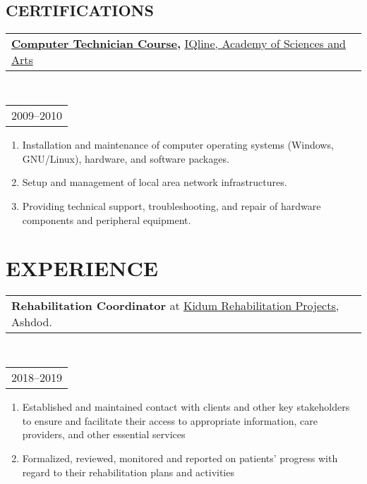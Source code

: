 \documentclass[11pt,a4paper,roman]{moderncv}      %
\makeatletter
\newcommand*{\customcventry}[7][.25em]{
	\begin{tabular}{@{}l} %
		{\bfseries #4} #3
	\end{tabular}
	\hfill%
	\begin{tabular}{l@{}}
	\end{tabular}
	\hfill
	\begin{tabular}{@{}l} %
		#7
	\end{tabular}
	\hfill%
	\begin{tabular}{l@{}} %
		 #2
	\end{tabular}
	\par\addvspace{#1}
}
\makeatother
\begin{document}
\subsection{CERTIFICATIONS}

{\customcventry{2009--2010}{\href{https://loona-il.000webhostapp.com/resume-references/computer-technitian-certificate.jpg}{IQline, Academy of Sciences and Arts}}{\href{https://loona-il.000webhostapp.com/resume-references/computer-technitian-certificate.jpg}{Computer Technician Course},}{Ashdod}{}{}	
	
	\begin{enumerate}[leftmargin=0.75cm,label=\textcolor{cyan}{\textbullet}]
		\itemsep 0em 
		\item Installation and maintenance of computer operating systems (Windows, GNU/Linux), hardware, and software packages.
		\item Setup and management of local area network infrastructures.
		\item Providing technical support, troubleshooting, and repair of hardware components and peripheral equipment. 
	\end{enumerate}
}

\section{EXPERIENCE}

{\customcventry{2018--2019}{at \href{http://www.kidumpro.co.il/}{Kidum Rehabilitation Projects,} Ashdod.}{Rehabilitation Coordinator}{}{}{}	
	
	\begin{enumerate}[leftmargin=0.75cm,label=\textcolor{cyan}{\textbullet}]
		\itemsep 0em 
		\item Established and maintained contact with clients and other key stakeholders to ensure and facilitate their access to appropriate information, care providers, and other essential services
		\item Formalized, reviewed, monitored and reported on patients' progress with regard to their rehabilitation plans and activities
	\end{enumerate}
}
\end{document}
